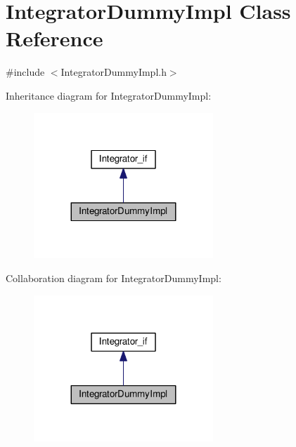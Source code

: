 \hypertarget{class_integrator_dummy_impl}{}\section{Integrator\+Dummy\+Impl Class Reference}
\label{class_integrator_dummy_impl}


{\ttfamily \#include $<$Integrator\+Dummy\+Impl.\+h$>$}



Inheritance diagram for Integrator\+Dummy\+Impl\+:
\nopagebreak
\begin{figure}[H]
\begin{center}
\leavevmode
\includegraphics[width=191pt]{class_integrator_dummy_impl__inherit__graph}
\end{center}
\end{figure}


Collaboration diagram for Integrator\+Dummy\+Impl\+:
\nopagebreak
\begin{figure}[H]
\begin{center}
\leavevmode
\includegraphics[width=191pt]{class_integrator_dummy_impl__coll__graph}
\end{center}
\end{figure}
